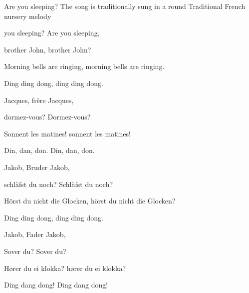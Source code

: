 \begin{SBSong}{Are you sleeping?}
    {The song is traditionally sung in a round}
    {Traditional French nursery melody}
  \begin{SBVerse}
     you sleeping? Are you sleeping, 

    brother John, brother John?

    Morning bells are ringing, morning bells are ringing. 

    Ding ding dong, ding ding dong.
  \end{SBVerse}
  \begin{SBVerse}
     Jacques, fr\`{e}re Jacques, 
    
    dormez-vous? Dormez-vous?

    Sonnent les matines! sonnent les matines!

    Din, dan, don. Din, dan, don.
  \end{SBVerse}
  \begin{SBVerse}
     Jakob, Bruder Jakob,  

    schl\"{a}fst du noch? Schl\"{a}fst du noch?
    
    H\"{o}rst du nicht die Glocken, h\"{o}rst du nicht die Glocken? 

    Ding ding dong, ding ding dong.
  \end{SBVerse}
  \begin{SBVerse}
     Jakob, Fader Jakob,  
  
    Sover du? Sover du?
    
    H\o rer du ei klokka? h\o rer du ei klokka?
    
    Ding dang dong! Ding dang dong!
  \end{SBVerse}
\end{SBSong}

